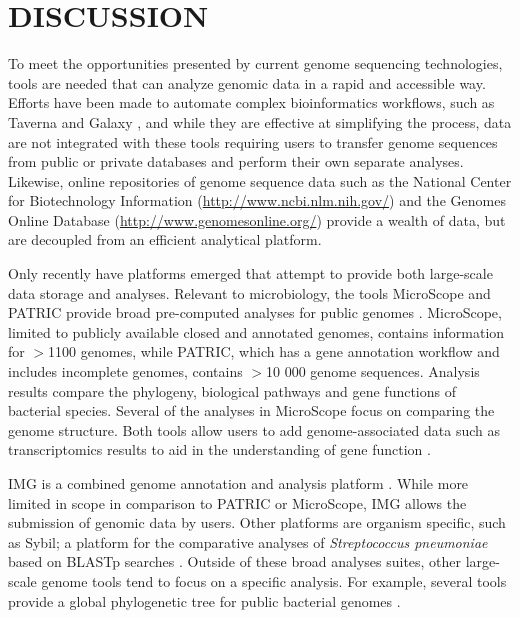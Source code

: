\documentclass[a4paper,twoside]{article}
\begin{document}
\section{\uppercase{Discussion}}
\label{sec:discussion}

To meet the opportunities presented by current genome sequencing technologies, tools are needed that can analyze genomic data in a rapid and accessible way. Efforts have been made to automate complex bioinformatics workflows, such as Taverna \cite{lanzen_taverna_2008} and Galaxy \cite{goecks_galaxy:_2010}, and while they are effective at simplifying the process, data are not integrated with these tools requiring users to transfer genome sequences from public or private databases and perform their own separate analyses. Likewise, online repositories of genome sequence data such as the National Center for Biotechnology Information (\url{http://www.ncbi.nlm.nih.gov/}) and the Genomes Online Database (\url{http://www.genomesonline.org/}) provide a wealth of data, but are decoupled from an efficient analytical platform. 

Only recently have platforms emerged that attempt to provide both large-scale data storage and analyses. Relevant to microbiology, the tools MicroScope and PATRIC provide broad pre-computed analyses for public genomes \cite{vallenet_microscope--integrated_2012,wattam2013}.  MicroScope, limited to publicly available closed and annotated genomes, contains information for $>$1100 genomes, while PATRIC, which has a gene annotation workflow and includes incomplete genomes, contains $>$10 000 genome sequences. Analysis results compare the phylogeny, biological pathways and gene functions of bacterial species. Several of the analyses in MicroScope focus on comparing the genome structure. Both tools allow users to add genome-associated data such as transcriptomics results to aid in the understanding of gene function \cite{vallenet_microscope--integrated_2012,wattam2013}. 

IMG is a combined genome annotation and analysis platform \cite{marko2013}. While more limited in scope in comparison to PATRIC or MicroScope, IMG allows the submission of genomic data by users. Other platforms are organism specific, such as Sybil; a platform for the comparative analyses of \textit{Streptococcus pneumoniae} based on BLASTp searches \cite{riley_using_2012}. Outside of these broad analyses suites, other large-scale genome tools tend to focus on a specific analysis. For example, several tools provide a global phylogenetic tree for public bacterial genomes \cite{letunic2011,fang2013,federhen2012}.
\end{document}
